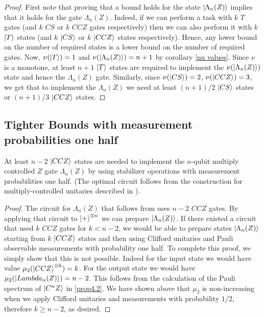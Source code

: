 \documentclass[12pt]{dalthesis}
\begin{document}
\begin{proof}
First note that proving that a bound holds for the state $\ket{\Lambda_n (Z)}$ implies that it holds for the gate $\Lambda_n (Z)$. Indeed, if we can perform a task with $k$ $T$ gates (and $k$ $CS$ or $k$ $CCZ$ gates respectively) then we can also perform it with $k$ $\ket{T}$ states (and $k$ $\ket{CS}$ or $k$ $\ket{CCZ}$ states respectively). Hence, any lower bound on the number of required states is a lower bound on the number of required gates. Now, $\nu (\ket{T}) = 1$ and $\nu (\ket{\Lambda_n (Z)}) = n+1$ by corollary \ref{nu values}. Since $\nu$ is a monotone, at least $n+1$ $\ket{T}$ states are required to implement the $\nu (\ket{\Lambda_n (Z)})$ state and hence the $\Lambda_n (Z)$ gate. Similarly, since $\nu (\ket{CS}) = 2$, $\nu (\ket{CCZ}) = 3$, we get that to implement the $\Lambda_n (Z)$ we need at least $(n+1)/2$ $\ket{CS}$ states or $(n+1)/3$ $\ket{CCZ}$ states.
\end{proof}



\subsection{Tighter Bounds with measurement probabilities one half}


\begin{lemma}
\label{CCZ lowerbound}
At least $n-2$ $\ket{CCZ}$ states are needed to implement the $n$-qubit multiply controlled $Z$ gate $\Lambda_n (Z)$ by using stabilizer operations with measurement probabilities one half. (The optimal circuit follows from the construction for multiply-controlled unitaries described in \cite{}).
\end{lemma}
\begin{proof}
The circuit for $\Lambda_n (Z)$ that follows from \cite{} uses $n-2$ $CCZ$ gates. By applying that circuit to $\ket{+}^{\otimes n}$ we can prepare $\ket{\Lambda_n (Z)}$. If there existed a circuit that used $k$ $CCZ$ gates for $k < n-2$, we would be able to prepare states $\ket{\Lambda_n (Z)}$ starting from $k$ $\ket{CCZ}$ states and then using Clifford unitaries and Pauli observable measurements with probability one half. To complete this proof, we simply show that this is not possible. Indeed for the input state we would have value $\mu_2 (\ket{CCZ}^{\otimes k}) = k$. For the output state we would have $\mu_2 (\ket{\\Lambda_n (Z)}) = n-2$. This follows from the calculation of the Pauli spectrum of $\ket{C^nZ}$ in \ref{prop4.2}. We have shown above that $\mu_2$ is non-increasing when we apply Clifford unitaries and measurements with probability $1/2$, therefore $k \geq n-2$, as desired.
\end{proof}
\end{document}
